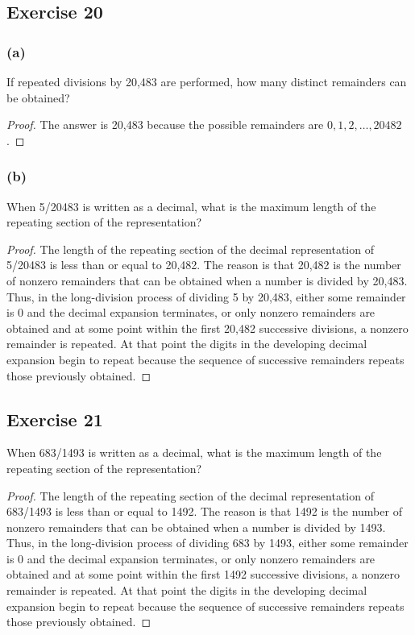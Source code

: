 \documentclass[14pt]{extarticle}
\begin{document}
\subsection{Exercise 20}
\subsubsection{(a)}
If repeated divisions by 20,483 are performed, how many distinct remainders can be obtained?

\begin{proof}
The answer is 20,483 because the possible remainders are \(0, 1, 2, \ldots, 20482\).
\end{proof}

\subsubsection{(b)}
When 5/20483 is written as a decimal, what is the maximum length of the repeating section of the representation?

\begin{proof}
The length of the repeating section of the decimal representation of 5/20483 is less than or equal to 20,482. 
The reason is that 20,482 is the number of nonzero remainders that can be obtained when a number is divided by 
20,483. Thus, in the long-division process of dividing 5 by 20,483, either some remainder is 0 and the decimal 
expansion terminates, or only nonzero remainders are obtained and at some point within the first 20,482 
successive divisions, a nonzero remainder is repeated. At that point the digits in the developing decimal expansion 
begin to repeat because the sequence of successive remainders repeats those previously obtained.
\end{proof}

\subsection{Exercise 21}
When 683/1493 is written as a decimal, what is the maximum length of the repeating section of the representation?

\begin{proof}
The length of the repeating section of the decimal representation of 683/1493 is less than or equal to 1492. 
The reason is that 1492 is the number of nonzero remainders that can be obtained when a number is divided by 1493. 
Thus, in the long-division process of dividing 683 by 1493, either some remainder is 0 and the decimal expansion 
terminates, or only nonzero remainders are obtained and at some point within the first 1492 successive divisions, a 
nonzero remainder is repeated. At that point the digits in the developing decimal expansion begin to repeat because 
the sequence of successive remainders repeats those previously obtained.
\end{proof}
\end{document}
